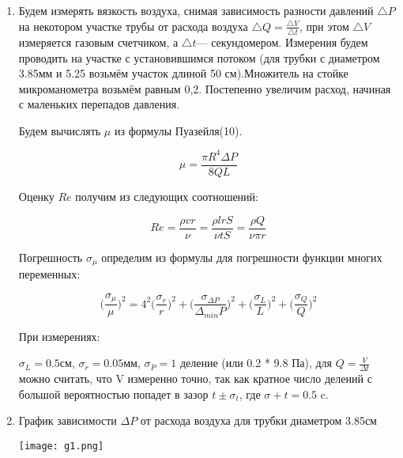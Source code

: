 \documentclass{article}
\begin{document}
\begin{enumerate}

    \item  Будем измерять вязкость воздуха, снимая зависимость разности давлений $\bigtriangleup P$ на некотором участке трубы от расхода воздуха $\bigtriangleup Q = \frac{\bigtriangleup V}{\bigtriangleup t}$, при этом $\bigtriangleup V$ измеряется газовым счетчиком, а $\bigtriangleup t$— секундомером. Измерения будем проводить на участке с установившимся потоком (для трубки с диаметром 3.85мм и 5.25 возьмём участок длиной 50 см).Множитель на стойке микроманометра возьмём равным 0,2. Постепенно увеличим расход, начиная с маленьких перепадов давления.
    
   Будем вычислять $\mu$ из формулы Пуазейля(10).
    
    \begin{equation}
        \mu = \frac {\pi R ^ 4 \Delta P}{8 QL}
      \end{equation}
    
    Оценку $Re$ получим из следующих соотношений:

    \begin{equation}    
        Re = \frac{\rho vr}{\nu} = \frac{\rho lrS}{\nu tS} = \frac{\rho Q}{\nu \pi r}
    \end{equation}
        
    Погрешность $\sigma_\mu$ определим из формулы для погрешности функции многих переменных:

    \begin{equation}
        \bigg(\frac{\sigma_\mu}{\mu}\bigg) ^ 2 =    4^2 \bigg(\frac{\sigma_r}{r}\bigg) ^ 2 +  \bigg(\frac{\sigma_{\Delta P}}{\Delta_{min} P}\bigg) ^ 2 + \bigg(\frac{\sigma_L}{L}\bigg) ^ 2 +
        \bigg(\frac{\sigma_Q}{Q}\bigg) ^ 2 
    \end{equation}
    
    
    При измерениях:

        $\sigma_L = 0.5 см$, $\sigma_r = 0.05 мм$, $ \sigma_P = 1 $ деление (или 0.2 * 9.8 Па), для $Q = \frac{V}{\Delta t}$ можно считать, что V измеренно точно, так как кратное число делений с большой вероятностью попадет в зазор $t \pm \sigma_t$, где $\sigma+t = 0.5$ c.
    
    
    \item График зависимости $\Delta P$ от расхода воздуха для трубки диаметром 3.85см
    
    \begin{center} 
        \texttt{[image: g1.png]}
    \end{center}
    

\end{enumerate}
\end{document}
